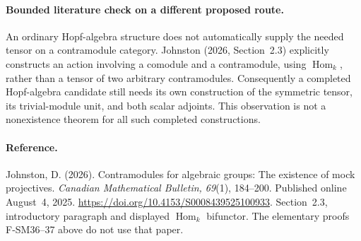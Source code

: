 \paragraph{Bounded literature check on a different proposed route.}
An ordinary Hopf-algebra structure does not automatically supply
the needed tensor on a contramodule category.  Johnston (2026,
Section~2.3) explicitly constructs an action involving a comodule
and a contramodule, using \(\operatorname{Hom}_k\), rather than
a tensor of two arbitrary contramodules.  Consequently a
completed Hopf-algebra candidate still needs its own construction
of the symmetric tensor, its trivial-module unit, and both
scalar adjoints.  This observation is not a nonexistence theorem
for all such completed constructions.

\paragraph{Reference.}
Johnston, D. (2026). Contramodules for algebraic groups: The
existence of mock projectives. \emph{Canadian Mathematical
Bulletin, 69}(1), 184--200. Published online August~4, 2025.
\url{https://doi.org/10.4153/S0008439525100933}.
Section~2.3, introductory paragraph and displayed
\(\operatorname{Hom}_k\) bifunctor.  The elementary proofs
F-SM36--37 above do not use that paper.
